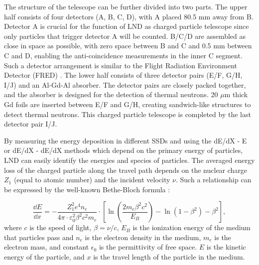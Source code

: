The structure of the telescope can be further divided into two parts. The upper half consists of four detectors (A, B, C, D), with A placed 80.5 mm away from B. Detector A is crucial for the function of \ac{LND} as charged particle telescope since only particles that trigger detector A will be counted. B/C/D are assembled as close in space as possible, with zero space between B and C and 0.5 mm between C and D, enabling the anti-coincidence measurements in the inner C segment. Such a detector arrangement is similar to the Flight Radiation Environment Detector (FRED) \citep{moeller-etal-2013, moeller-etal-2013b}. The lower half consists of three detector pairs (E/F, G/H, I/J) and an Al-Gd-Al absorber. The detector pairs are closely packed together, and the absorber is designed for the detection of thermal neutrons. 20 $\mu$m thick Gd foils are inserted between E/F and G/H, creating sandwich-like structures to detect thermal neutrons. This charged particle telescope is completed by the last detector pair I/J.

By measuring the energy deposition in different \acp{SSD} and using the dE/dX - E or dE/dX - dE/dX methods which depend on the primary energy of particles, LND can easily identify the energies and species of particles. 
The averaged energy loss of the charged particle along the travel path depends on the nuclear charge $Z_1$ (equal to atomic number) and the incident velocity $\nu$. 
Such a relationship can be expressed by the well-known Bethe-Bloch formula \citep{bethe-1930, bloch-1933}:

\begin{equation}
    \frac{\dd E}{\dd x} = - \frac{Z_1^2 e^4 n_e}{4 \pi \cdot \varepsilon_0^2 \beta^2 c^2 m_e} \cdot \left[ \ln\left(\frac{2 m_e  \beta^2 c^2}{{E_B}}\right) - \ln(1 - \beta^2) - \beta^2  \right], 
    \label{eq:BB}
  \end{equation}
where $c$ is the speed of light, $\beta = \nu/c$, $E_B$ is the ionization energy of the medium that particles pass and $n_e$ is the electron density in the medium, $m_e$ is the electron mass, and constant $\epsilon_0$ is the permittivity of free space. $E$ is the kinetic energy of the particle, and $x$ is the travel length of the particle in the medium.

